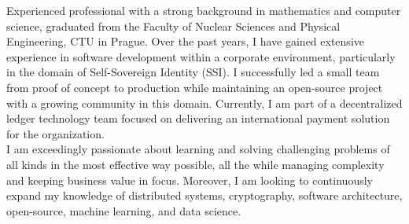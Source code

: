 \documentclass[9pt]{developercv} %
\begin{document}
\vspace{0.5cm}



\begin{minipage}[t]{1\textwidth} %
	\vspace{-\baselineskip} %
  Experienced professional with a strong background in mathematics and computer science, graduated from the Faculty of Nuclear Sciences and Physical Engineering, CTU in Prague. Over the past years, I have gained extensive experience in software development within a corporate environment, particularly in the domain of Self-Sovereign Identity (SSI). I successfully led a small team from proof of concept to production while maintaining an open-source project with a growing community in this domain. Currently, I am part of a decentralized ledger technology team focused on delivering an international payment solution for the organization. \\

I am exceedingly passionate about learning and solving challenging problems of all kinds in the most effective way possible, all the while managing complexity and keeping business value in focus. Moreover, I am looking to continuously expand my knowledge of distributed systems, cryptography, software architecture, open-source, machine learning, and data science.

\end{minipage}
\hfill %

\end{document}
